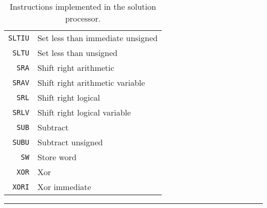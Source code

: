 \begin{table}[h]
\begin{center}
\begin{tabular}{r|l}
            \texttt{SLTIU} & Set less than immediate unsigned \\
            \texttt{SLTU} & Set less than unsigned \\
            \texttt{SRA} & Shift right arithmetic \\
            \texttt{SRAV} & Shift right arithmetic variable \\
            \texttt{SRL} & Shift right logical \\
            \texttt{SRLV} & Shift right logical variable \\
            \texttt{SUB} & Subtract \\
            \texttt{SUBU} & Subtract unsigned \\
            \texttt{SW} & Store word \\
            \texttt{XOR} & Xor \\
            \texttt{XORI} & Xor immediate \\
        \end{tabular}
        \smallskip
        \hrule
        \smallskip
        \caption{Instructions implemented in the solution processor.}
        \label{table:implemented-instructions}
    \end{center}
\end{table}
